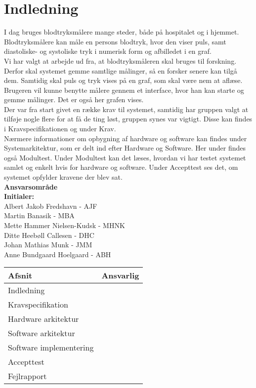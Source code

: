 \chapter{Indledning}
I  dag bruges blodtryksmålere mange steder, både på hospitalet og i hjemmet. Blodtryksmålere kan måle en persons blodtryk, hvor den viser puls, samt diastoliske- og systoliske tryk i numerisk form og afbilledet i en graf.\\ 
Vi har valgt at arbejde ud fra, at blodtryksmåleren skal bruges til forskning. Derfor skal systemet gemme samtlige målinger, så en forsker senere kan tilgå dem. Samtidig skal puls og tryk vises på en graf, som skal være nem at aflæse. Brugeren vil kunne benytte målere gennem et interface, hvor han kan starte og gemme målinger. Det er også her grafen vises. \\
Der var fra start givet en række krav til systemet, samtidig har gruppen valgt at tilføje nogle flere for at få de ting løst, gruppen synes var vigtigt. Disse kan findes i Kravspecifikationen og under Krav.\\
Nærmere informationer om opbygning af hardware og software kan findes under Systemarkitektur, som er delt ind efter Hardware og Software. Her under findes også Modultest. 
Under Modultest kan det læses, hvordan vi har testet systemet samlet og enkelt hvis for hardware og software. Under Accepttest ses det, om systemet opfylder kravene der blev sat.\\ 


\textbf{Ansvarsområde} \\
\textbf{Initialer: } \\
Albert Jakob Fredshavn - AJF \\
Martin Banasik - MBA \\
Mette Hammer Nielsen-Kudsk - MHNK \\
Ditte Heebøll Callesen - DHC \\
Johan Mathias Munk - JMM \\
Anne Bundgaard Hoelgaard - ABH \\


\begin{longtabu} to 
    Afsnit &    Ansvarlig\\[-1ex]
    \midrule
    Indledning & \\
    Kravspecifikation & \\
    Hardware arkitektur & \\
    Software arkitektur & \\
    Software implementering & \\
    Accepttest & \\
    Fejlrapport & \\
    
    
    

\end{longtabu}